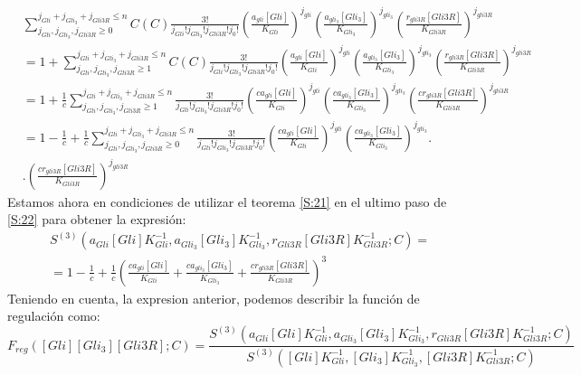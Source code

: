 \begin{equation}
\begin{split}
&\sum_{j_{Gli}, j_{Gli_3}, j_{Gli3R}\geq0}^{j_{Gli}+ j_{Gli_3}+ j_{Gli3R}\leq n}\textit{C}(C)\frac{3!}{j_{Gli}! j_{Gli_3}! j_{Gli3R}!j_0!}
\left(\frac{a_{gli}[Gli]}{K_{Gli}}\right)^{j_{gli}}
\left(\frac{a_{gli_3}[Gli_3]}{K_{Gli_3}}\right)^{j_{gli_3}}
\left(\frac{r_{gli3R}[Gli3R]}{K_{Gli3R}}\right)^{j_{gli3R}}\\&=
1+\sum_{j_{Gli}, j_{Gli_3}, j_{Gli3R}\geq1}^{j_{Gli}+ j_{Gli_3}+ j_{Gli3R}\leq n}\textit{C}(C)\frac{3!}{j_{Gli}! j_{Gli_3}! j_{Gli3R}!j_0!}
\left(\frac{a_{gli}[Gli]}{K_{Gli}}\right)^{j_{gli}}
\left(\frac{a_{gli_3}[Gli_3]}{K_{Gli_3}}\right)^{j_{gli_3}}
\left(\frac{r_{gli3R}[Gli3R]}{K_{Gli3R}}\right)^{j_{gli3R}}\\&=
1+\frac{1}{c}\sum_{j_{Gli}, j_{Gli_3}, j_{Gli3R}\geq1}^{j_{Gli}+ j_{Gli_3}+ j_{Gli3R}\leq n}\frac{3!}{j_{Gli}! j_{Gli_3}! j_{Gli3R}!j_0!}
\left(\frac{ca_{gli}[Gli]}{K_{Gli}}\right)^{j_{gli}}
\left(\frac{ca_{gli_3}[Gli_3]}{K_{Gli_3}}\right)^{j_{gli_3}}
\left(\frac{cr_{gli3R}[Gli3R]}{K_{Gli3R}}\right)^{j_{gli3R}}\\&=
1-\frac{1}{c}+\frac{1}{c}\sum_{j_{Gli}, j_{Gli_3}, j_{Gli3R}\geq0}^{j_{Gli}+ j_{Gli_3}+ j_{Gli3R}\leq n}\frac{3!}{j_{Gli}! j_{Gli_3}! j_{Gli3R}!j_0!}
\left(\frac{ca_{gli}[Gli]}{K_{Gli}}\right)^{j_{gli}}
\left(\frac{ca_{gli_3}[Gli_3]}{K_{Gli_3}}\right)^{j_{gli_3}}.\\&.
\left(\frac{cr_{gli3R}[Gli3R]}{K_{Gli3R}}\right)^{j_{gli3R}}
\end{split}
\label{S:22}
\end{equation}
Estamos ahora en condiciones de utilizar el teorema \ref{S:21} en el ultimo paso de \ref{S:22} para obtener la expresión:
\begin{equation}
\begin{split}
&S^{(3)}(a_{Gli}[Gli]K_{Gli}^{-1},a_{Gli_3}[Gli_3]K_{Gli_3}^{-1},r_{Gli3R}[Gli3R]K_{Gli3R}^{-1};C)=\\&=
1-\frac{1}{c}+\frac{1}{c}\left(\frac{ca_{gli}[Gli]}{K_{Gli}}+\frac{ca_{gli_3}[Gli_3]}{K_{Gli_3}}+\frac{cr_{gli3R}[Gli3R]}{K_{Gli3R}}\right)^3
\end{split}
\end{equation}
Teniendo en cuenta, la expresion anterior, podemos describir la función de regulación como: 
\begin{equation}
F_{reg}([Gli][Gli_3][Gli3R];C)=\frac{S^{(3)}(a_{Gli}[Gli]K_{Gli}^{-1},a_{Gli_3}[Gli_3]K_{Gli_3}^{-1},r_{Gli3R}[Gli3R]K_{Gli3R}^{-1};C)}{S^{(3)}([Gli]K_{Gli}^{-1},[Gli_3]K_{Gli_3}^{-1},[Gli3R]K_{Gli3R}^{-1};C)}
\end{equation}

